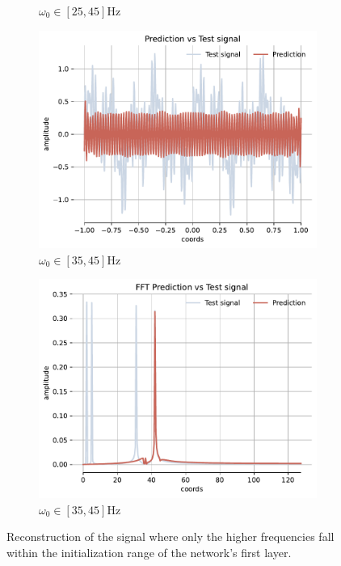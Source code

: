 \begin{figure}[h!]
\begin{subfigure}[b]{0.38\textwidth}
        \caption{$\omega_0 \in [25, 45]$Hz}
        \label{fig:fft-25-45}
    \end{subfigure}
    \begin{subfigure}[b]{0.38\textwidth}
        \centering
        \includegraphics[width=\textwidth]{img/ch3/prediction_w35-45.pdf}
        \caption{$\omega_0 \in [35, 45]$Hz}
        \label{fig:rec-35-45}
    \end{subfigure}
    \begin{subfigure}[b]{0.38\textwidth}
        \centering
        \includegraphics[width=\textwidth]{img/ch3/fft_w35-45.pdf}
        \caption{$\omega_0 \in [35, 45]$Hz}
        \label{fig:fft-35-45}
    \end{subfigure}
    \label{f:high-freqs-reconstruction}
    \caption{Reconstruction of the signal where only the higher frequencies fall within the initialization range of the network’s first layer.}
\end{figure}

